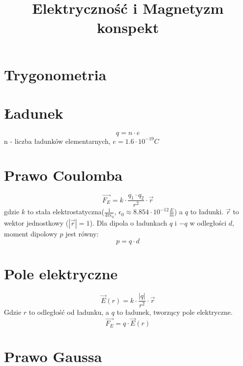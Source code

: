 \documentclass{../konspekt}
\title{Elektryczność i Magnetyzm konspekt}
\begin{document}
\begin{multicols}{2}

  \begin{multicols}{2}

    \section{Trygonometria}

    \section{Ładunek}

    $$
    q = n \cdot e
    $$
    n - liczba ładunków elementarnych, $e = 1.6 \cdot 10^{-19} C$

  \end{multicols}

  \section{Prawo Coulomba}

  $$
  \vec{F_E} = k \cdot \frac{q_1 \cdot q_2}{r^2} \cdot \vec{r}
  $$
  gdzie $k$ to stała elektrostatyczna($\frac{1}{4\pi\epsilon_0}$,
  $\epsilon_0\approx8.854\cdot10^{-12}\frac{E}{m}$) a $q$ to ładunki.
  $\vec{r}$ to wektor jednostkowy ($|\vec{r}|=1$).
  Dla dipola o ładunkach $q$ i $-q$ w odległości $d$, moment dipolowy
  $p$ jest równy:
  $$
  p = q \cdot d
  $$

  \section{Pole elektryczne}

  $$
  \vec{E}(r) = k \cdot \frac{|q|}{r^2} \cdot \vec{r}
  $$
  Gdzie $r$ to odległość od ładunku, a $q$ to ładunek, tworzący pole
  elektryczne.
  $$
  \vec{F_E} = q \cdot \vec{E}(r)
  $$

  \section{Prawo Gaussa}


\end{multicols}
\end{document}
